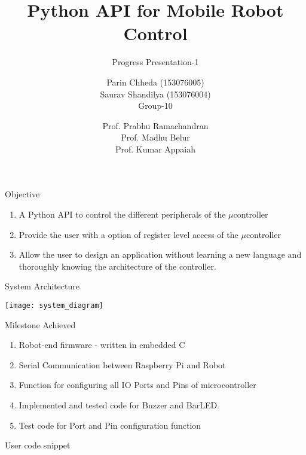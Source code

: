 \documentclass[10pt,handout,english]{beamer}
\title[] %
{Python API for Mobile Robot Control}
\subtitle{Progress Presentation-1}
\author[AE-663 Course Project 2016-17] %
{Parin Chheda (153076005) \\ Saurav Shandilya (153076004) \\ Group-10 }
\institute [Indian Institute of Technology Bombay]%
{
  
}
\date[\today] %
{Prof. Prabhu Ramachandran \\ Prof. Madhu Belur \\ Prof. Kumar Appaiah}
\begin{document}
 
\frame{\titlepage}

\begin{frame}{Objective}
\begin{enumerate}
	\item A Python API to control the different peripherals of the ${\mu}$controller
	\item Provide the user with a option of register level access of the ${\mu}$controller
	\item Allow the user to design an application without learning a new language and thoroughly knowing the architecture of the controller.
\end{enumerate}
\end{frame}

\begin{frame}{System Architecture}

\texttt{[image: system\_diagram]}

\end{frame}

\begin{frame}{Milestone Achieved}
\begin{enumerate}
\item Robot-end firmware - written in embedded C
\item Serial Communication between Raspberry Pi and Robot
\item Function for configuring all IO Ports and Pins of microcontroller
\item Implemented and tested code for Buzzer and BarLED.  
\item Test code for Port and Pin configuration function
\end{enumerate}

\end{frame}

\begin{frame}{User code snippet}
	
\end{frame}
\end{document}
